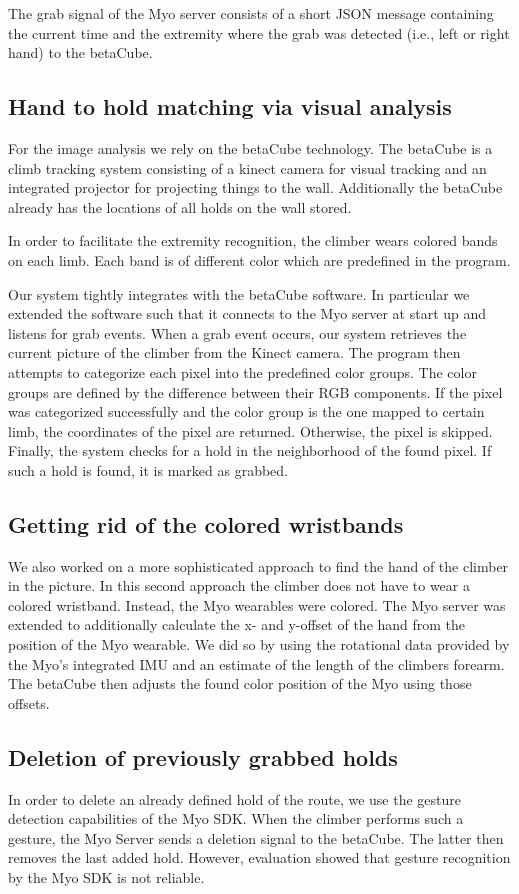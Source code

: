 The grab signal of the Myo server consists of a short JSON message containing the current time and the extremity where the grab was detected (i.e., left or right hand) to the betaCube.

\subsection{Hand to hold matching via visual analysis}
For the image analysis we rely on the betaCube technology.
The betaCube is a climb tracking system consisting of a kinect camera for visual tracking and an integrated projector for projecting things to the wall.
Additionally the betaCube already has the locations of all holds on the wall stored.

In order to facilitate the extremity recognition, the climber wears colored bands on each limb.
Each band is of different color which are predefined in the program.

Our system tightly integrates with the betaCube software.
In particular we extended the software such that it connects to the Myo server at start up and listens for grab events.
When a grab event occurs, our system retrieves the current picture of the climber from the Kinect camera.
The program then attempts to categorize each pixel into the predefined color groups.
The color groups are defined by the difference between their RGB components.
If the pixel was categorized successfully and the color group is the one mapped to certain limb, the coordinates of the pixel are returned.
Otherwise, the pixel is skipped.
Finally, the system checks for a hold in the neighborhood of the found pixel.
If such a hold is found, it is marked as grabbed.

\subsection{Getting rid of the colored wristbands}
We also worked on a more sophisticated approach to find the hand of the climber in the picture.
In this second approach the climber does not have to wear a colored wristband.
Instead, the Myo wearables were colored.
The Myo server was extended to additionally calculate the x- and y-offset of the hand from the position of the Myo wearable.
We did so by using the rotational data provided by the Myo's integrated IMU and an estimate of the length of the climbers forearm.
The betaCube then adjusts the found color position of the Myo using those offsets.

\subsection{Deletion of previously grabbed holds}

In order to delete an already defined hold of the route, we use the gesture detection capabilities of the Myo SDK.
When the climber performs such a gesture, the Myo Server sends a deletion signal to the betaCube.
The latter then removes the last added hold.
However, evaluation showed that gesture recognition by the Myo SDK is not reliable.
